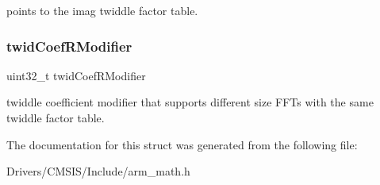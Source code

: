 points to the imag twiddle factor table. \mbox{\label{structarm__rfft__instance__f32_a5b06f7f76c018db993fe6acc5708c589}} 
\subsubsection{\texorpdfstring{twid\+Coef\+R\+Modifier}{twidCoefRModifier}}
{\footnotesize\ttfamily uint32\+\_\+t twid\+Coef\+R\+Modifier}

twiddle coefficient modifier that supports different size F\+F\+Ts with the same twiddle factor table. 

The documentation for this struct was generated from the following file\+:\begin{DoxyCompactItemize}
\item 
Drivers/\+C\+M\+S\+I\+S/\+Include/arm\+\_\+math.\+h\end{DoxyCompactItemize}
